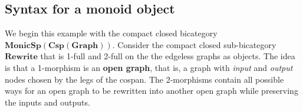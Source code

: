 \documentclass[11pt]{amsart}
\newcommand{\cat}[1]{\mathbf{#1}}
\newcommand{\bimonspcsp}[1]{\mathbf{MonicSp(Csp(#1))}}
\theoremstyle{remark}
\theoremstyle{definition}
\begin{document}
\subsection{Syntax for a monoid object} %
\label{subsec:Rewrite}

We begin this example with the 
compact closed bicategory 
	$\bimonspcsp{Graph}$.  
Consider the compact closed sub-bicategory 
$\cat{Rewrite}$ that is 
1-full and 2-full on the 
the edgeless graphs as objects.
The idea is that a 1-morphism is 
an \textbf{open graph},
that is, a graph with 
\emph{input} and \emph{output} nodes 
chosen by the legs of the cospan. 
The 2-morphisms contain 
all possible ways for an open graph 
to be rewritten into another open graph
while preserving the inputs and outputs. 
\end{document}
